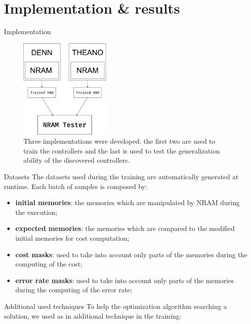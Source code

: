 \documentclass[xcolor={usenames}]{beamer}
\begin{document}
  \section{Implementation \& results}
  \begin{frame}{Implementation}
  	\begin{figure}
  		\centering
  		\includegraphics[width=0.4\textwidth]{../figures/nram-implementation.png}
  		\caption{Three implementations were developed: the first two are used to train the controllers and the last is used to test the generalization ability of the discovered controllers.}
  	\end{figure}
  \end{frame}
  \begin{frame}{Datasets}
  	The datasets used during the training are automatically generated at runtime. Each batch of samples is composed by:
	\begin{itemize}
		\item{\textbf{initial memories}: the memories which are manipulated by NRAM during the execution;}
		\item{\textbf{expected memories}: the memories which are compared to the modified initial memories for cost computation;}
		\item{\textbf{cost masks}: used to take into account only parts of the memories during the computing of the cost;}
		\item{\textbf{error rate masks}: used to take into account only parts of the memories during the computing of the error rate;}
	\end{itemize}
  \end{frame}
  \begin{frame}{Additional used techniques}
  	To help the optimization algorithm searching a solution, we used as in \cite{NRAM:2016} additional technique in the training:
  	\begin{itemize}
  	\end{itemize}
  \end{frame}
\end{document}
